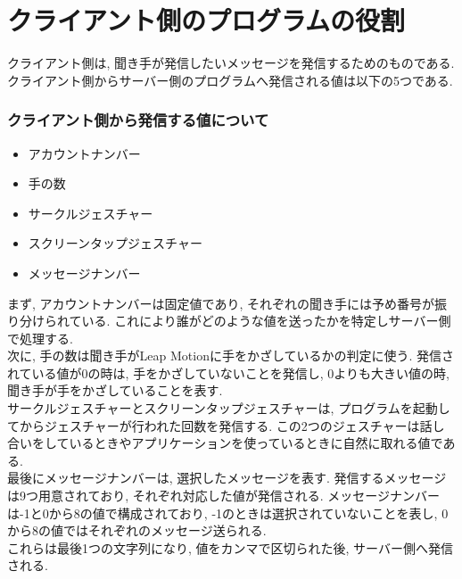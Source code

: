 \documentclass{funthesis}
\begin{document}

\section{クライアント側のプログラムの役割}
クライアント側は, 聞き手が発信したいメッセージを発信するためのものである. クライアント側からサーバー側のプログラムへ発信される値は以下の5つである. 
\subsubsection{クライアント側から発信する値について}
\begin{itemize}
 \item アカウントナンバー
 \item 手の数
 \item サークルジェスチャー
 \item スクリーンタップジェスチャー
 \item  メッセージナンバー
\end{itemize}
まず, アカウントナンバーは固定値であり, それぞれの聞き手には予め番号が振り分けられている. これにより誰がどのような値を送ったかを特定しサーバー側で処理する. \\
次に, 手の数は聞き手がLeap Motionに手をかざしているかの判定に使う. 発信されている値が0の時は, 手をかざしていないことを発信し, 0よりも大きい値の時, 聞き手が手をかざしていることを表す. \\
サークルジェスチャーとスクリーンタップジェスチャーは, プログラムを起動してからジェスチャーが行われた回数を発信する. この2つのジェスチャーは話し合いをしているときやアプリケーションを使っているときに自然に取れる値である. \\
最後にメッセージナンバーは, 選択したメッセージを表す. 発信するメッセージは9つ用意されており, それぞれ対応した値が発信される. メッセージナンバーは-1と0から8の値で構成されており, -1のときは選択されていないことを表し, 0から8の値ではそれぞれのメッセージ送られる. \\
これらは最後1つの文字列になり, 値をカンマで区切られた後, サーバー側へ発信される.  
\end{document}
